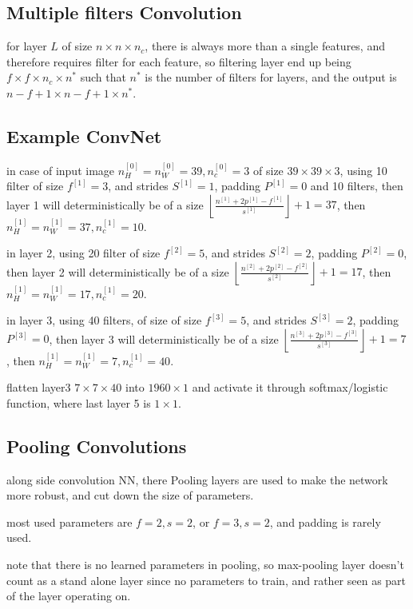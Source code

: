 \documentclass[4apaper,12pt]{book}
\begin{document}
\begin{description}
    \subsection{Multiple filters Convolution}
    \begin{description}
      \item for layer $L$ of size $n\times{n}\times{n_c}$, there is always more than a single features, and therefore requires filter for each feature, so filtering layer end up being $f\times{f}\times{n_c}\times{n^*}$ such that $n^*$ is the number of filters for layers, and the output is $n-f+1\times{n-f+1}\times{n^*}$.
    \end{description}
    \subsection{Example ConvNet}
    \begin{description}
    \item in case of input image $n_H^{[0]}=n_W^{[0]}=39, n_c^{[0]}=3$ of size $39 \times{39} \times{3}$, using 10 filter of size $f^{[1]}=3$, and strides $S^{[1]}=1$, padding $P^{[1]}=0$ and 10 filters, then layer 1 will deterministically be of a size  $\left \lfloor{\frac{n^{[1]}+2p^{[1]}-f^{[1]}}{s^{[1]}}}\right \rfloor + 1=37$, then $n_H^{[1]}=n_W^{[1]}=37,n_c^{[1]}=10$.
    \item in layer 2, using 20 filter of size $f^{[2]}=5$, and strides $S^{[2]}=2$, padding $P^{[2]}=0$, then layer 2 will deterministically be of a size  $\left \lfloor{\frac{n^{[2]}+2p^{[2]}-f^{[2]}}{s^{[2]}}}\right \rfloor + 1=17$, then $n_H^{[1]}=n_W^{[1]}=17,n_c^{[1]}=20$.
    \item in layer 3, using 40 filters,  of size of size $f^{[3]}=5$, and strides $S^{[3]}=2$, padding $P^{[3]}=0$, then layer 3 will deterministically be of a size  $\left \lfloor{\frac{n^{[3]}+2p^{[3]}-f^{[3]}}{s^{[3]}}}\right \rfloor + 1=7$, then $n_H^{[1]}=n_W^{[1]}=7 ,n_c^{[1]}=40$.
    \item flatten layer3 $7 \times{7} \times{40}$ into $1960\times{1}$ and activate it through softmax/logistic function, where last layer 5 is $1\times{1}$.

    \end{description}
    \subsection{Pooling Convolutions}
    \begin{description}
    \item along side convolution NN, there Pooling layers are used to make the network more robust, and cut down the size of parameters.
    \item most used parameters are $f=2,s=2$, or $f=3,s=2$, and padding is rarely used.
    \item note that there is no learned parameters in pooling, so max-pooling layer doesn't count as a stand alone layer since no parameters to train, and rather seen as part of the layer operating on.

\end{description}
\end{description}
\end{document}
